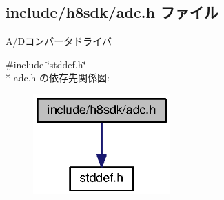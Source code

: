 \subsection{include/h8sdk/adc.h ファイル}
\label{adc_8h}


A/\+Dコンバータドライバ  


{\ttfamily \#include \char`\"{}stddef.\+h\char`\"{}}\\*
adc.\+h の依存先関係図\+:
\nopagebreak
\begin{figure}[H]
\begin{center}
\leavevmode
\includegraphics[width=149pt]{dd/dce/adc_8h__incl}
\end{center}
\end{figure}
